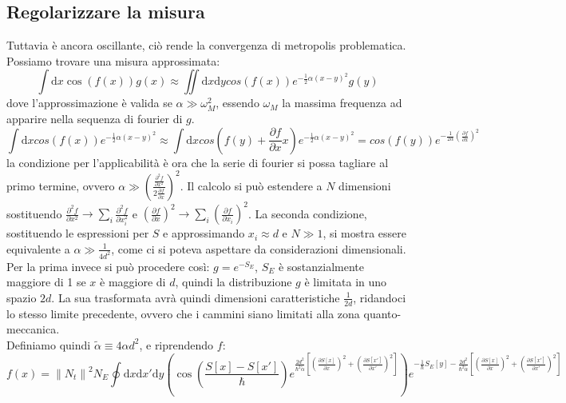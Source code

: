 \documentclass[italian]{article}
\newcommand{\deriv}[1]{\frac{\partial #1}{\partial x}}
\newcommand{\dderiv}[2]{\frac{\partial #1}{\partial #2}}
\newcommand{\dx}{\mathrm{d}x}
\newcommand{\dy}{\mathrm{d}y}
\begin{document}
	\subsection{Regolarizzare la misura}
	Tuttavia è ancora oscillante, ciò rende la convergenza di metropolis problematica. Possiamo trovare una misura approssimata:
	\begin{equation*}
		\int \dx \cos(f(x)) g(x) \approx \iint \dx \dy cos(f(x)) e^{-\frac{1}{2}\alpha(x-y)^2} g(y)
	\end{equation*}
	dove l'approssimazione è valida se $\alpha \gg \omega_M^2$, essendo $\omega_M$ la massima frequenza ad apparire nella sequenza di fourier di $g$.
	\begin{equation*}
		\int \dx cos(f(x)) e^{-\frac{1}{2}\alpha(x-y)^2} \approx
		\int \dx cos\left(f(y) + \deriv{f} x\right) e^{-\frac{1}{2}\alpha(x-y)^2} =
		cos(f(y))e^{-\frac{1}{2\alpha} \left(\deriv{f}\right)^2}
	\end{equation*}
	la condizione per l'applicabilità è ora che la serie di fourier si possa tagliare al primo termine, ovvero $\alpha \gg \left(\frac{\frac{\partial^2 f}{\partial x^2}}{2 \deriv{f}}\right)^2$. Il calcolo si può estendere a $N$ dimensioni sostituendo $\frac{\partial^2 f}{\partial x^2} \to \sum_{i} \frac{\partial^2 f}{\partial x_i^2}$ e $\left(\deriv{f}\right)^2 \to \sum_{i} \left(\frac{\partial f}{\partial x_i}\right)^2$.
	La seconda condizione, sostituendo le espressioni per $S$ e approssimando $x_i \approx d$ e $N \gg 1$, si mostra essere equivalente a $\alpha \gg \frac{1}{4d^2}$, come ci si poteva aspettare da considerazioni dimensionali.
	Per la prima invece si può procedere così: $g = e^{-S_E}$,
	$S_E$ è sostanzialmente maggiore di 1 se $x$ è maggiore di $d$, quindi la distribuzione $g$ è limitata in uno spazio $2d$. La sua trasformata avrà quindi dimensioni caratteristiche $\frac{1}{2d}$, ridandoci lo stesso limite precedente, ovvero che i cammini siano limitati alla zona quanto-meccanica. \\
	Definiamo quindi $ \tilde{\alpha} \equiv 4\alpha d^2$, e riprendendo $f$:
	\begin{equation}
		f(x) =  \left\|N_t\right\|^2N_E \oint \mathrm{d}x\mathrm{d}x'\mathrm{d}y 
		\left(\cos\left(\frac{S[x]-S[x']}{\hbar}\right)
		e^{\frac{2d^2}{\hbar^2\tilde{\alpha}}\left[ \left(\dderiv{S[x]}{x}\right)^2 +\left(\dderiv{S[x']}{x'}\right)^2 \right]}\right)
		 e^{-\frac{1}{\hbar}S_E[y] - \frac{2d^2}{\hbar^2\tilde{\alpha}}\left[ \left(\dderiv{S[x]}{x}\right)^2 +\left(\dderiv{S[x']}{x'}\right)^2 \right]}
	\end{equation}
\end{document}
